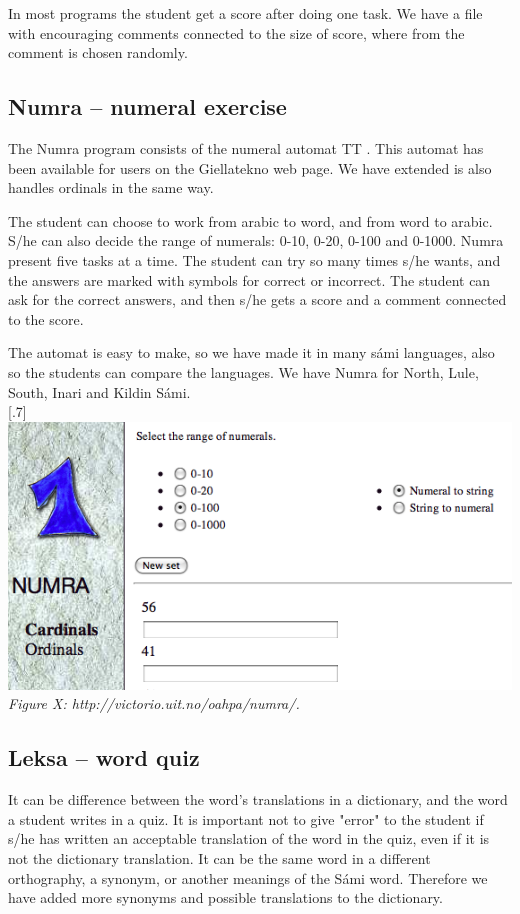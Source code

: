 \documentclass[a4paper,12pt]{article}
\begin{document}
In most programs the student get a score after doing one task. We have a file with encouraging comments connected to the size of score, where from the comment is chosen randomly.

\subsection{Numra -- numeral exercise}
The Numra program consists of the numeral automat TT . This automat has been available for users on the Giellatekno web page. We have extended is also handles ordinals in the same way.  

The student can choose to work from arabic to word, and from word to arabic. S/he can also decide the range of numerals: 0-10, 0-20, 0-100 and 0-1000. Numra present five tasks at a time. The student can try so many times s/he wants, and the answers are marked with symbols for correct or incorrect. The student can ask for the correct answers, and then s/he gets a score and a comment connected to the score.

The automat is easy to make, so we have made it in many sámi languages, also so the students can compare the languages. We have Numra for North, Lule, South, Inari and Kildin Sámi.\\ 


\scalebox{.7}[.7]{\includegraphics{img/numra.png}}\\
\textit{Figure X: http://victorio.uit.no/oahpa/numra/.} 

\subsection{Leksa -- word quiz}
It can be difference between the word's translations in a dictionary, and the word a student writes in a quiz. It is important not to give "error" to the student if s/he has written an acceptable translation of the word in the quiz, even if it is not the dictionary translation. It can be the same word in a different orthography, a synonym, or another meanings of the Sámi word. Therefore we have added more synonyms and possible translations to the dictionary.
\end{document}
